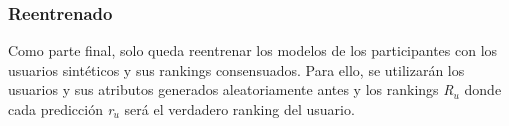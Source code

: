 \subsubsection{Reentrenado}
Como parte final, solo queda reentrenar los modelos de los participantes con los usuarios sintéticos y sus rankings consensuados. Para ello, se utilizarán los usuarios y sus atributos generados aleatoriamente antes y los rankings \textit{R$_{u}$} donde cada predicción \textit{r$_{u}$} será el verdadero ranking del usuario.
